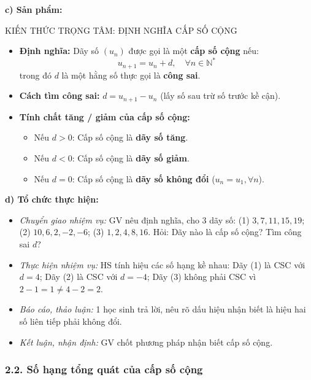 \documentclass[12pt, a4paper]{article}
\begin{document}
\noindent \textbf{c) Sản phẩm:}  
  
\begin{pedabox}{KIẾN THỨC TRỌNG TÂM: ĐỊNH NGHĨA CẤP SỐ CỘNG}  
\begin{itemize}[leftmargin=0.6cm]  
    \item \textbf{Định nghĩa:} Dãy số $(u_n)$ được gọi là một \textbf{cấp số cộng} nếu:  
    $$u_{n+1} = u_n + d, \quad \forall n \in \mathbb{N}^*$$  
    trong đó $d$ là một hằng số thực gọi là \textbf{công sai}.  
    \item \textbf{Cách tìm công sai:} $d = u_{n+1} - u_n$ (lấy số sau trừ số trước kề cận).  
    \item \textbf{Tính chất tăng / giảm của cấp số cộng:}  
    \begin{itemize}  
        \item Nếu $d > 0$: Cấp số cộng là \textbf{dãy số tăng}.  
        \item Nếu $d < 0$: Cấp số cộng là \textbf{dãy số giảm}.  
        \item Nếu $d = 0$: Cấp số cộng là \textbf{dãy số không đổi} ($u_n = u_1, \forall n$).  
    \end{itemize}  
\end{itemize}  
\end{pedabox}  
  
\noindent \textbf{d) Tổ chức thực hiện:}  
\begin{itemize}[leftmargin=0.8cm]  
    \item \textit{Chuyển giao nhiệm vụ:} GV nêu định nghĩa, cho 3 dãy số:  
    (1) $3, 7, 11, 15, 19$; \quad (2) $10, 6, 2, -2, -6$; \quad (3) $1, 2, 4, 8, 16$.  
    Hỏi: Dãy nào là cấp số cộng? Tìm công sai $d$?  
    \item \textit{Thực hiện nhiệm vụ:} HS tính hiệu các số hạng kề nhau:  
    Dãy (1) là CSC với $d = 4$; Dãy (2) là CSC với $d = -4$; Dãy (3) không phải CSC vì $2 - 1 = 1 \neq 4 - 2 = 2$.  
    \item \textit{Báo cáo, thảo luận:} 1 học sinh trả lời, nêu rõ dấu hiệu nhận biết là hiệu hai số liên tiếp phải không đổi.  
    \item \textit{Kết luận, nhận định:} GV chốt phương pháp nhận biết cấp số cộng.  
\end{itemize}  
  
\subsubsection*{2.2. Số hạng tổng quát của cấp số cộng}  
  
\end{document}
